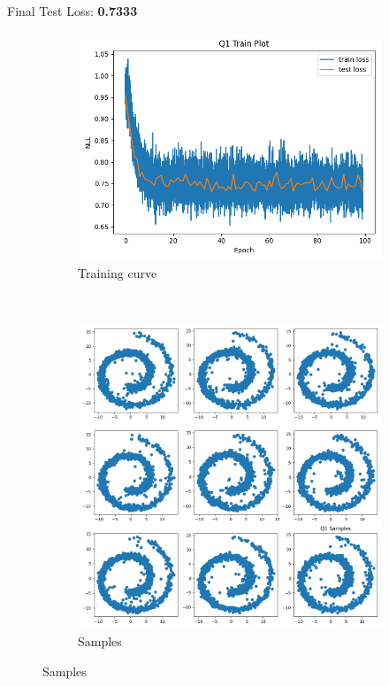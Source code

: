\documentclass{article}
\begin{document}
Final Test Loss: \textbf{0.7333} \\
\begin{figure}[H]
    \centering
    \begin{subfigure}{0.5\textwidth}
        \centering
        \includegraphics[width=\textwidth]{figures/q1_train_plot.png}
        \caption{Training curve}
    \end{subfigure}
    \\
    \begin{subfigure}{0.5\textwidth}
        \centering
        \includegraphics[width=\textwidth]{figures/q1_samples.png}
        \caption{Samples}
    \end{subfigure}
    
\end{figure}
\end{document}
